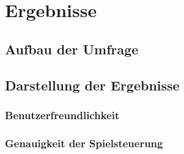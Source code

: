 
\chapter{Ergebnisse}


\section{Aufbau der Umfrage}
\section{Darstellung der Ergebnisse}
\subsection{Benutzerfreundlichkeit}
\subsection{Genauigkeit der Spielsteuerung}



